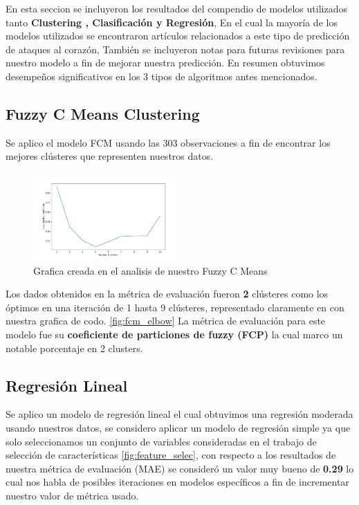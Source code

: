 \documentclass[10pt,journal]{IEEEtran}
\begin{document}
En esta seccion se incluyeron los resultados del compendio de modelos utilizados tanto \textbf{Clustering , Clasificación y Regresión}, En el cual la mayoría de los modelos utilizados se encontraron artículos relacionados a este tipo de predicción de ataques al corazón, También se incluyeron notas para futuras revisiones para nuestro modelo a fin de mejorar nuestra predicción. En resumen obtuvimos desempeños significativos en los 3 tipos de algoritmos antes mencionados.

\subsection{Fuzzy C Means Clustering}
Se aplico el modelo FCM usando las 303 observaciones a fin de encontrar los mejores clústeres que representen nuestros datos.

\begin{figure}[ht]
    \centering
    \includegraphics[width=0.5\textwidth,height=0.5\textheight,keepaspectratio]{elbow.pdf}
    \caption{ Grafica creada en el analisis de nuestro Fuzzy C Means} 
    \label{fig:fcm_elbow}
\end{figure}

Los dados obtenidos en la métrica de evaluación fueron \textbf{2} clústeres como los óptimos en una iteración de 1 hasta 9 clústeres, representado claramente en con nuestra grafica de codo. \autoref{fig:fcm_elbow} La métrica de evaluación para este modelo fue su \textbf{coeficiente de particiones de fuzzy (FCP)} la cual marco un notable porcentaje en 2 clusters.


\subsection{Regresión Lineal}

Se aplico un modelo de regresión lineal el cual obtuvimos una regresión moderada usando nuestros datos, se considero aplicar un modelo de regresión simple ya que solo seleccionamos un conjunto de variables consideradas en el trabajo de selección de características \ref{fig:feature_selec}, con respecto a los resultados de  nuestra métrica de evaluación (MAE) se consideró  un valor muy bueno de  \textbf{0.29} lo cual nos habla de posibles iteraciones en modelos específicos a fin de incrementar nuestro valor de métrica usado.
\end{document}

